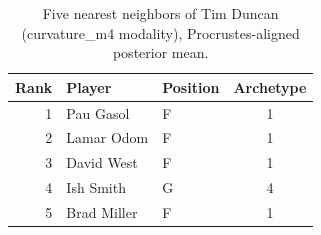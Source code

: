 \begin{table}[htbp]
  \centering\small
  \begin{tabular}{rllc}
    \toprule
    Rank & Player & Position & Archetype \\
    \midrule
    1 & Pau Gasol & F & 1 \\
    2 & Lamar Odom & F & 1 \\
    3 & David West & F & 1 \\
    4 & Ish Smith & G & 4 \\
    5 & Brad Miller & F & 1 \\
    \bottomrule
  \end{tabular}
  \caption{Five nearest neighbors of Tim Duncan (curvature_m4 modality), Procrustes-aligned posterior mean.}
  \label{tab:Tim_Duncan_neighbors_curvature_m4}
\end{table}

